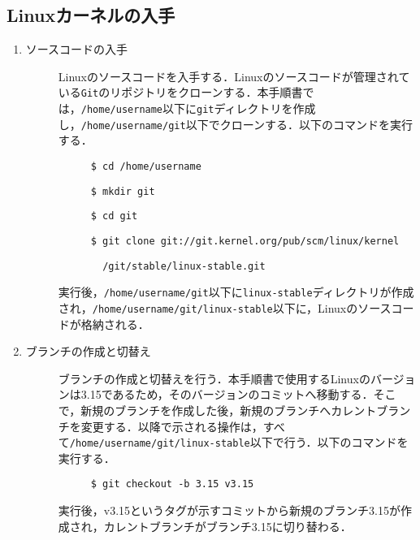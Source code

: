 \documentclass[12pt]{jsarticle}
\begin{document}
\subsection{Linuxカーネルの入手}
\begin{enumerate}
\item ソースコードの入手
  \begin{description}
  \item[] Linuxのソースコードを入手する．Linuxのソースコードが管理されている\verb|Git|のリポジトリをクローンする．本手順書では，\verb|/home/username|以下に\verb|git|ディレクトリを作成し，\verb|/home/username/git|以下でクローンする．以下のコマンドを実行する．
    \begin{description}
    \item[] \verb|$ cd /home/username|
    \item[] \verb|$ mkdir git|
    \item[] \verb|$ cd git|
    \item[] \verb|$ git clone git://git.kernel.org/pub/scm/linux/kernel|
    \item[] \verb|  /git/stable/linux-stable.git|
    \end{description}
  \item[] 実行後，\verb|/home/username/git|以下に\verb|linux-stable|ディレクトリが作成され，\verb|/home/username/git/linux-stable|以下に，Linuxのソースコードが格納される．
  \end{description}
\item ブランチの作成と切替え
  \begin{description}
  \item[] ブランチの作成と切替えを行う．本手順書で使用するLinuxのバージョンは3.15であるため，そのバージョンのコミットへ移動する．そこで，新規のブランチを作成した後，新規のブランチへカレントブランチを変更する．以降で示される操作は，すべて\verb|/home/username/git/linux-stable|以下で行う．以下のコマンドを実行する．
    \begin{description}
    \item[] \verb|$ git checkout -b 3.15 v3.15|
    \end{description}
  \item[] 実行後，v3.15というタグが示すコミットから新規のブランチ3.15が作成され，カレントブランチがブランチ3.15に切り替わる．
  \end{description}
\end{enumerate}
\end{document}
